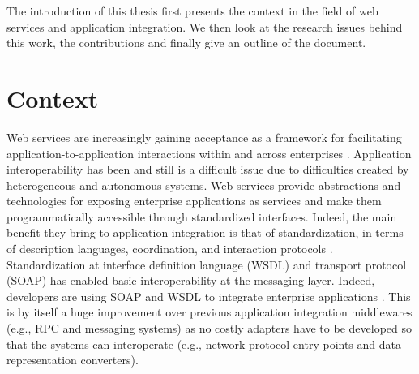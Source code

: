 
The introduction of this thesis first presents the context in the field of web services and application integration. We then look at the research issues behind this work, the contributions and finally give an outline of the document.


\section{Context}


Web services are increasingly gaining acceptance as a framework for facilitating
application-to-application interactions within and across enterprises \cite{Alonso04}. Application interoperability
has been and still is a difficult issue due to difficulties created by heterogeneous and autonomous
systems. Web services provide abstractions and technologies for exposing enterprise applications as
services and make them programmatically accessible through standardized interfaces. Indeed, the main
benefit they bring to application integration is that of standardization, in terms of description
languages, coordination, and interaction protocols \cite{Alonso04,ws_cacm_special_issue,PTDL07,PH07}.
Standardization at interface definition language (WSDL) and transport protocol (SOAP) has enabled
basic interoperability at the messaging layer. Indeed, developers are using SOAP and WSDL to
integrate enterprise applications \cite{WS-standards}. This is by itself a huge improvement over previous application integration middlewares (e.g., RPC and messaging systems) as no costly adapters have to be developed so that the systems can interoperate (e.g., network protocol entry points and data representation converters).\\

